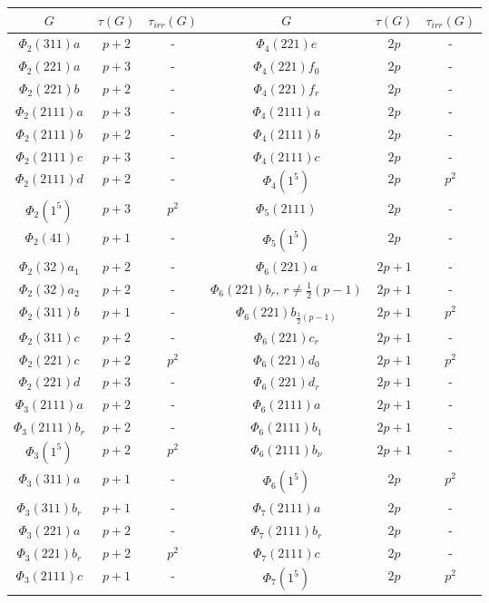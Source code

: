 \documentclass[a4paper,11pt]{amsart}
\numberwithin{equation}{section}
\numberwithin{equation}{subsection}
\begin{document}
\begin{table}[H]
\centering
\small
\begin{tabular}{|c|c|c||c|c|c|}
\hline
$G$ & $\tau(G)$ & $\tau_{irr}(G)$ & $G$ & $\tau(G)$ & $\tau_{irr}(G)$  \\ 
\hline
$\Phi_2(311)a$ & $p+2$ & - & $\Phi_4(221)e$ & $2p$ & - \\ 
$\Phi_2(221)a$ & $p+3$ & - & $\Phi_4(221)f_0$ & $2p$ & - \\ 
$\Phi_2(221)b$ & $p+2$ & - & $\Phi_4(221)f_r$ & $2p$ & - \\ 
$\Phi_2(2111)a$ & $p+3$ & - & $\Phi_4(2111)a$ & $2p$ & - \\ 
$\Phi_2(2111)b$ & $p+2$ & - & $\Phi_4(2111)b$ & $2p$ & - \\ 
$\Phi_2(2111)c$ & $p+3$ & - & $\Phi_4(2111)c$ & $2p$ & - \\ 
$\Phi_2(2111)d$ & $p+2$ & - & $\Phi_4(1^5)$ & $2p$ & $p^2$ \\ 
$\Phi_2(1^5)$ & $p+3$ & $p^2$ & $\Phi_5(2111)$ & $2p$ & - \\ 
$\Phi_2(41)$ & $p+1$ & - & $\Phi_5(1^5)$ & $2p$ & - \\ 
$\Phi_2(32)a_1$ & $p+2$ & - & $\Phi_6(221)a$ & $2p+1$ & - \\ 
$\Phi_2(32)a_2$ & $p+2$ & - & $\Phi_6(221)b_r, \, r \neq \tfrac{1}{2}(p-1)$ & $2p+1$ & - \\ 
$\Phi_2(311)b$ & $p+1$ & - & $\Phi_6(221)b_{\tfrac{1}{2}(p-1)}$ & $2p+1$ & $p^2$ \\ 
$\Phi_2(311)c$ & $p+2$ & - & $\Phi_6(221)c_r$ & $2p+1$ & - \\ 
$\Phi_2(221)c$ & $p+2$ & $p^2$ & $\Phi_6(221)d_0$ & $2p+1$ & $p^2$ \\ 
$\Phi_2(221)d$ & $p+3$ & - & $\Phi_6(221)d_r$ & $2p+1$ & - \\ 
$\Phi_3(2111)a$ & $p+2$ & - & $\Phi_6(2111)a$ & $2p+1$ & - \\ 
$\Phi_3(2111)b_r$ & $p+2$ & - & $\Phi_6(2111)b_1$ & $2p+1$ & - \\ 
$\Phi_3(1^5)$ & $p+2$ & $p^2$ & $\Phi_6(2111)b_\nu$ & $2p+1$ & - \\ 
$\Phi_3(311)a$ & $p+1$ & - &  $\Phi_6(1^5)$ & $2p$  & $p^2$ \\ 
$\Phi_3(311)b_r$ & $p+1$ & - & $\Phi_7(2111)a$ & $2p$ & - \\ 
$\Phi_3(221)a$ & $p+2$ & - & $\Phi_7(2111)b_r$ & $2p$ & - \\ 
$\Phi_3(221)b_r$ & $p+2$ & $p^2$ & $\Phi_7(2111)c$ & $2p$ & - \\ 
$\Phi_3(2111)c$ & $p+1$ & - & $\Phi_7(1^5)$ & $2p$ & $p^2$ \\ 

\end{tabular}
\end{table}
\end{document}
